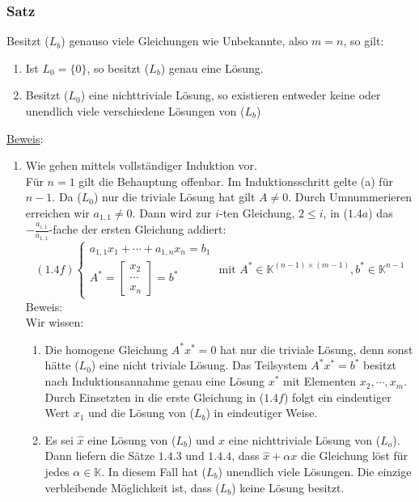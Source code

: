 \subsubsection{Satz}
Besitzt ($L_b$) genauso viele Gleichungen wie Unbekannte, also $m=n$, so gilt:
\renewcommand{\labelenumi}{(\alph{enumi})}
\begin{enumerate}
\item Ist $L_0=\{0\}$, so besitzt ($L_b$) genau eine Lösung.
\item Besitzt ($L_0$) eine nichttriviale Lösung, so existieren entweder keine oder unendlich viele verschiedene Lösungen von ($L_b$)
\end{enumerate}
\underline{Beweis}:
\begin{enumerate}
\item Wie gehen mittels vollständiger Induktion vor.\\
Für $n=1$ gilt die Behauptung offenbar.  Im Induktionsschritt gelte (a) für $n-1$.  Da ($L_0$) nur die triviale Lösung hat gilt $A\not= 0$.  Durch Umnummerieren erreichen wir $a_{1,1}\not= 0$.  Dann wird zur $i$-ten Gleichung, $2\leq i$, in ($1.4a$) das $-\frac{a_{i,1}}{a_{1,1}}$-fache der ersten Gleichung addiert:
\[(1.4f)\begin{cases}a_{1,1}x_1+\cdots +a_{1,n}x_n = b_1\\ A^*=\left[\begin{array}{c}x_2\\ \cdots \\ x_n\end{array}\right]= b^*\end{cases} \text{ mit }A^*\in \mathbb{K}^{(n-1)\times (m-1)}, b^*\in \mathbb{K}^{n-1} \]
Beweis: \\
Wir wissen:
\begin{enumerate}
\item Die homogene Gleichung $A^*x^* = 0$ hat nur die triviale Lösung, denn sonst hätte ($L_0$) eine nicht triviale Lösung.  Das Teilsystem $A^*x^* = b^*$ besitzt nach Induktionsannahme genau eine Lösung $x^*$ mit Elementen $x_2,\cdots ,x_m$.  Durch Einsetzten in die erste Gleichung in ($1.4f$) folgt ein eindeutiger Wert $x_1$ und die Lösung von ($L_b$) in eindeutiger Weise.
\item Es sei $\hat{x}$ eine Lösung von ($L_b$) und $x$ eine nichttriviale Lösung von ($L_o$).  Dann liefern die Sätze $1.4.3$ und $1.4.4$, dass $\hat{x}+\alpha x$ die Gleichung löst für jedes $\alpha \in \mathbb{K}$.  In diesem Fall hat ($L_b$) unendlich viele Lösungen.  Die einzige verbleibende Möglichkeit ist, dass ($L_b$) keine Lösung besitzt.
\end{enumerate}
\end{enumerate}
